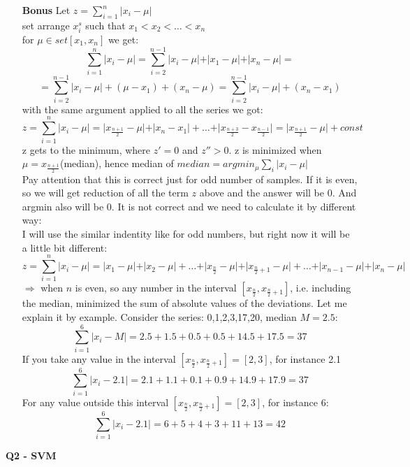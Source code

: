 \documentclass[12pt,a4paper]{article}
\begin{document}
\begin{enumerate}[label=(\alph*)]
\item[\textbf{Bonus}] Let $z = \sum_{i=1}^{n}\vert x_i - \mu \vert$\\[5pt]
set arrange $x_i^s$ such that $x_1<x_2<\dots<x_n$\\[5pt]
for $\mu \in set[x_1,x_n]$ we get:
$$
\displaystyle \sum_{i=1}^{n}\vert x_i - \mu \vert = \sum_{i=2}^{n-1}\vert x_i - \mu \vert + \vert x_1 - \mu \vert + \vert x_n - \mu \vert = 
$$$$
\displaystyle = \sum_{i=2}^{n-1}\vert x_i - \mu \vert + (\mu - x_1) + (x_n - \mu) = \sum_{i=2}^{n-1}\vert x_i - \mu \vert + (x_n - x_1)
$$
with the same argument applied to all the series we got:
$$
\displaystyle z = \sum_{i=1}^{n}\vert x_i - \mu \vert = \vert x_{\frac{n+1}{2}} - \mu \vert + \vert x_n - x_1 \vert + \dots + \vert x_{\frac{n+3}{2}} - x_{\frac{n-1}{2}} \vert= \vert  x_{\frac{n+1}{2}} - \mu \vert + const
$$
z gets to the minimum, where $z'=0$ and $z''>0$.  z is minimized when $\mu = x_{\frac{n+1}{2}}$(median), hence median of $median = argmin_{\mu}\sum_i \vert x_i - \mu \vert$\\
Pay attention that this is correct just for odd number of samples. If it is even, so we will get reduction of all the term $z$ above and the answer will be 0. And argmin also will be 0. It is not correct and we need to calculate it by different way:\\
I will use the similar indentity like for odd numbers, but right now it will be a little bit different: 
$$
\displaystyle z = \sum_{i=1}^{n}\vert x_i - \mu \vert = \vert x_1 - \mu \vert + \vert x_2 - \mu \vert + \dots + \vert x_{\frac{n}{2}} - \mu \vert+ \vert  x_{\frac{n}{2}+1} - \mu \vert + \dots +\vert x_{n-1} - \mu \vert + \vert x_n - \mu \vert
$$
$\Longrightarrow $ when $n$ is even, so any number in the interval $\left[ x_{\frac{n}{2}}, x_{\frac{n}{2}+1} \right]$, i.e. including the median, minimized the sum of absolute values of the deviations. Let me explain it by example. Consider the series: 0,1,2,3,17,20, median $M = 2.5$:
$$
\displaystyle \sum_{i=1}^{6} \vert x_i - M \vert =2.5 + 1.5 + 0.5 + 0.5 + 14.5 + 17.5= 37
$$
If you take any value in the interval $\left[ x_{\frac{n}{2}}, x_{\frac{n}{2}+1} \right] = [2,3]$, for instance 2.1
$$
\displaystyle \sum_{i=1}^{6} \vert x_i - 2.1 \vert =2.1 + 1.1 + 0.1 + 0.9 + 14.9 + 17.9= 37
$$
For any value outside this interval $\left[ x_{\frac{n}{2}}, x_{\frac{n}{2}+1} \right] = [2,3]$, for instance 6:
$$
\displaystyle \sum_{i=1}^{6} \vert x_i - 2.1 \vert =6 + 5 + 4 + 3 + 11 + 13= 42
$$
\end{enumerate}
\newpage
\begin{center}
	\textbf{Q2 - SVM}
\end{center}
\end{document}
